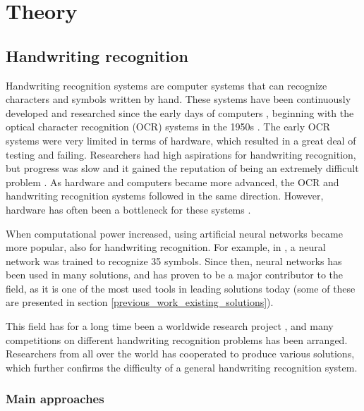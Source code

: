 \chapter{Theory}

\section{Handwriting recognition}
\label{handwriting_recognition}

Handwriting recognition systems are computer systems that can recognize characters and symbols written by hand. These systems have been continuously developed and researched since the early days of computers \parencite{simon_off-line_1992}, beginning with the optical character recognition (OCR) systems in the 1950s \parencite{mori_historical_1992}. The early OCR systems were very limited in terms of hardware, which resulted in a great deal of testing and failing. Researchers had high aspirations for handwriting recognition, but progress was slow and it gained the reputation of being an extremely difficult problem \parencite{simon_off-line_1992}. As hardware and computers became more advanced, the OCR and handwriting recognition systems followed in the same direction. However, hardware has often been a bottleneck for these systems \parencite{mori_historical_1992}.

When computational power increased, using artificial neural networks became more popular, also for handwriting recognition. For example, in \cite{fukushima_handwritten_????}, a neural network was trained to recognize 35 symbols. Since then, neural networks has been used in many solutions, and has proven to be a major contributor to the field, as it is one of the most used tools in leading solutions today (some of these are presented in section \ref{previous_work_existing_solutions}).

This field has for a long time been a worldwide research project \parencite{mori_historical_1992}, and many competitions on different handwriting recognition problems has been arranged. Researchers from all over the world has cooperated to produce various solutions, which further confirms the difficulty of a general handwriting recognition system. 

\subsection{Main approaches}
\label{main_approaches}

